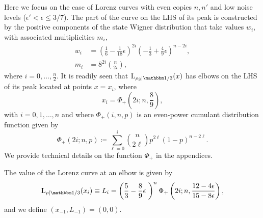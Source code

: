 \documentclass[pra,
aps,
twocolumn,
superscriptaddress,
groupedaddress,
nofootinbib,
reprint
]{revtex4-1}
\begin{document}
Here we focus on the case of Lorenz curves with even copies $n, n'$ and low noise levels ($\epsilon' < \epsilon \leq 3/7$).
The part of the curve on the LHS of its peak is constructed by the positive components of the state Wigner distribution that take values $w_i$, with associated multiplicities $m_i$,
\begin{align}
	w_i &= \left( \frac{1}{6} - \frac{1}{18}\epsilon \right)^{2i}\left( -\frac{1}{3} + \frac{4}{9}\epsilon \right)^{n-2i}, \\
	m_i &= 8^{2i}\binom{n}{2i},
\end{align}
where $i=0,\dots,\frac{n}{2}$.
It is readily seen that $\lc{\rho_{\rm{S}}}{\id/3}(x)$ has elbows on the LHS of its peak located at points $x=x_i$, where
\begin{equation}
	x_i = \Phi_+ \left( 2i; n , \frac{8}{9} \right),
\end{equation}
with $i = 0,1, \dots , n$ and where $\Phi_+(i,n,p)$ is an even-power cumulant distribution function given by
\begin{equation}
	\Phi_+(2i; n, p) \coloneqq \sum_{\ell=0}^{i} \binom{n}{2\ell} p ^{2\ell} (1-p)^{n-2\ell}.
\end{equation}
We provide technical details on the function $\Phi_+$ in the appendices.

The value of the Lorenz curve at an elbow is given by
\begin{equation}
	\lc{\rho}{\id/3}(x_{i}) \equiv L_{i} =  \left( \frac{5}{3} - \frac{8}{9}\epsilon\ \right)^{n} \Phi_+\left(2i;n,\frac{12-4\epsilon}{15-8\epsilon}\right),
\end{equation}
and we define $(x_{-1}, L_{-1}) = (0,0)$.

\end{document}
